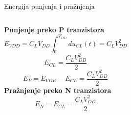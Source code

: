 \begin{frame}[label=09_2-s055]{Energija punjenja i pražnjenja}
\begin{columns}[T,onlytextwidth]\centering {}\textbf{Punjenje preko P tranzistora}
\[E_{VDD}=C_LV_{DD}\int_0^{V_{DD}}du_{CL}(t)=C_LV_{DD}^2\]
\[E_{CL}=\frac{C_LV_{DD}^2}2\]
\[E_P=E_{VDD}-E_{CL}=\frac{C_LV_{DD}^2}2\]
\textbf{Pražnjenje preko N tranzistora}
\[E_N=E_{CL}=\frac{C_LV_{DD}^2}2\]
\end{columns}
\end{frame}

